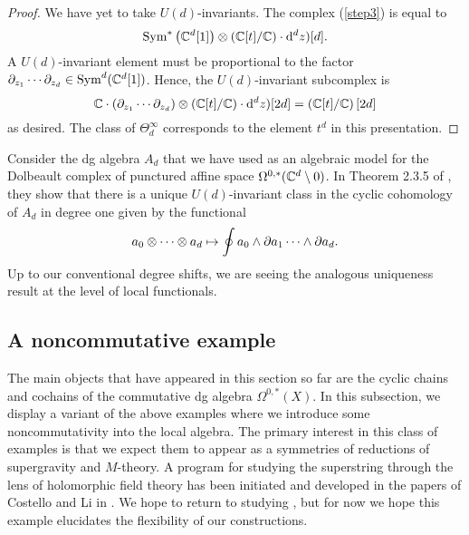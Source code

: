 \begin{proof}
We have yet to take $U(d)$-invariants. 
The complex (\ref{step3}) is equal to
\[
{\rm Sym}^* \left(\mathbb C^d[1]\right) \otimes (\mathbb C [t] / \mathbb C) \cdot {\rm d}^d z) [d] .
\]
A $U(d)$-invariant element must be proportional to the factor $\partial_{z_1} \cdots \partial_{z_d} \in {\rm Sym}^d(\mathbb C^d[1])$.
Hence, the $U(d)$-invariant subcomplex is
\[
\mathbb C \cdot (\partial_{z_1} \cdots \partial_{z_d}) \otimes (\mathbb C [t] / \mathbb C) \cdot {\rm d}^d z) [2d] = \left(\mathbb C[t] / \mathbb C\right) [2d]
\] 
as desired. 
The class of $\Theta^\infty_d$ corresponds to the element $t^{d}$ in this presentation. 
\end{proof}

Consider the dg algebra $A_d$ that we have used as an algebraic model for the Dolbeault complex of punctured affine space $\Omega^{0,*}(\mathbb C^d \setminus 0)$. 
In Theorem 2.3.5 of \cite{FHK}, they show that there is a unique $U(d)$-invariant class in the cyclic cohomology of $A_d$ in degree one given by the functional
\[
a_0 \otimes \cdots \otimes a_d \mapsto \oint a_0 \wedge \partial a_1 \cdots \wedge \partial a_d .
\]
Up to our conventional degree shifts, we are seeing the analogous uniqueness result at the level of local functionals. 


\subsection{A noncommutative example}


The main objects that have appeared in this section so far are the cyclic chains and cochains of the commutative dg algebra $\Omega^{0,*}(X)$. 
In this subsection, we display a variant of the above examples where we introduce some noncommutativity into the local algebra. 
The primary interest in this class of examples is that we expect them to appear as a symmetries of reductions of supergravity and $M$-theory. 
A program for studying the superstring through the lens of holomorphic field theory has been initiated and developed in the papers of Costello and Li in  \cite{...}.
We hope to return to studying , but for now we hope this example elucidates the flexibility of our constructions. 


